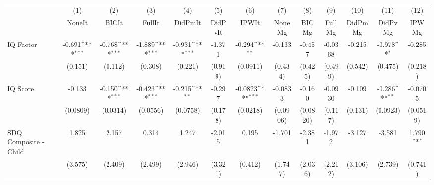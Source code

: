 {
\def\sym#1{\ifmmode^{#1}\else\(^{#1}\)\fi}
\begin{tabular}{l*{12}{c}}
\toprule
            &\multicolumn{1}{c}{(1)}&\multicolumn{1}{c}{(2)}&\multicolumn{1}{c}{(3)}&\multicolumn{1}{c}{(4)}&\multicolumn{1}{c}{(5)}&\multicolumn{1}{c}{(6)}&\multicolumn{1}{c}{(7)}&\multicolumn{1}{c}{(8)}&\multicolumn{1}{c}{(9)}&\multicolumn{1}{c}{(10)}&\multicolumn{1}{c}{(11)}&\multicolumn{1}{c}{(12)}\\
            &\multicolumn{1}{c}{NoneIt}&\multicolumn{1}{c}{BICIt}&\multicolumn{1}{c}{FullIt}&\multicolumn{1}{c}{DidPmIt}&\multicolumn{1}{c}{DidPvIt}&\multicolumn{1}{c}{IPWIt}&\multicolumn{1}{c}{NoneMg}&\multicolumn{1}{c}{BICMg}&\multicolumn{1}{c}{FullMg}&\multicolumn{1}{c}{DidPmMg}&\multicolumn{1}{c}{DidPvMg}&\multicolumn{1}{c}{IPWMg}\\
\midrule
IQ Factor   &      -0.691\sym{***}&      -0.768\sym{***}&      -1.889\sym{***}&      -0.931\sym{***}&      -1.371         &      -0.294\sym{**} &      -0.133         &      -0.457         &     -0.0368         &      -0.215         &      -0.978\sym{*}  &      -0.285         \\
            &     (0.151)         &     (0.112)         &     (0.308)         &     (0.221)         &     (0.919)         &    (0.0911)         &     (0.434)         &     (0.425)         &     (0.499)         &     (0.542)         &     (0.475)         &     (0.218)         \\
\addlinespace
IQ Score    &      -0.133         &      -0.150\sym{***}&      -0.423\sym{***}&      -0.215\sym{**} &      -0.297         &     -0.0823\sym{***}&     -0.0833         &      -0.160         &     -0.0930         &      -0.109         &      -0.286\sym{**} &     -0.0705         \\
            &    (0.0809)         &    (0.0314)         &    (0.0556)         &    (0.0758)         &     (0.178)         &    (0.0218)         &    (0.0906)         &    (0.0820)         &     (0.117)         &     (0.131)         &    (0.0923)         &    (0.0519)         \\
\addlinespace
SDQ Composite - Child&       1.825         &       2.157         &       0.314         &       1.247         &      -2.015         &       0.195         &      -1.701         &      -2.381         &      -1.972         &      -3.127         &      -3.581         &       1.790\sym{*}  \\
            &     (3.575)         &     (2.409)         &     (2.499)         &     (2.946)         &     (3.321)         &     (0.412)         &     (1.747)         &     (2.036)         &     (2.212)         &     (3.106)         &     (2.739)         &     (0.741)         \\

\end{tabular}}
